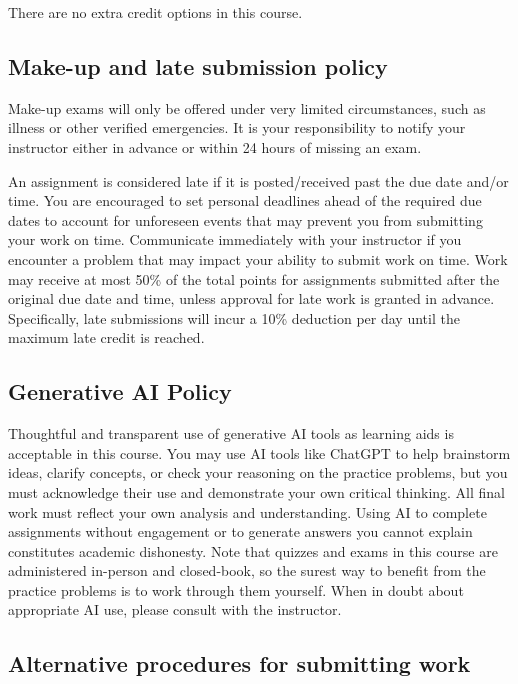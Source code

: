\documentclass{./../latex/syllabus}
\begin{document}
There are no extra credit options in this course.

\subsection*{Make-up and late submission policy}

Make-up exams will only be offered under very limited circumstances, such as illness or other verified emergencies. It is your responsibility to notify your instructor either in advance or within 24 hours of missing an exam. %

An assignment is considered late if it is posted/received past the due date and/or time. You are encouraged to set personal deadlines ahead of the required due dates to account for unforeseen events that may prevent you from submitting your work on time. Communicate immediately with your instructor if you encounter a problem that may impact your ability to submit work on time. Work may receive at most 50\% of the total points for assignments submitted after the original due date and time, unless approval for late work is granted in advance. Specifically, late submissions will incur a 10\% deduction per day until the maximum late credit is reached.

\subsection*{Generative AI Policy}

Thoughtful and transparent use of generative AI tools as learning aids is acceptable in this course. You may use AI tools like ChatGPT to help brainstorm ideas, clarify concepts, or check your reasoning on the practice problems, but you must acknowledge their use and demonstrate your own critical thinking. All final work must reflect your own analysis and understanding. Using AI to complete assignments without engagement or to generate answers you cannot explain constitutes academic dishonesty. Note that quizzes and exams in this course are administered in-person and closed-book, so the surest way to benefit from the practice problems is to work through them yourself. When in doubt about appropriate AI use, please consult with the instructor.

\subsection*{Alternative procedures for submitting work}
\end{document}
